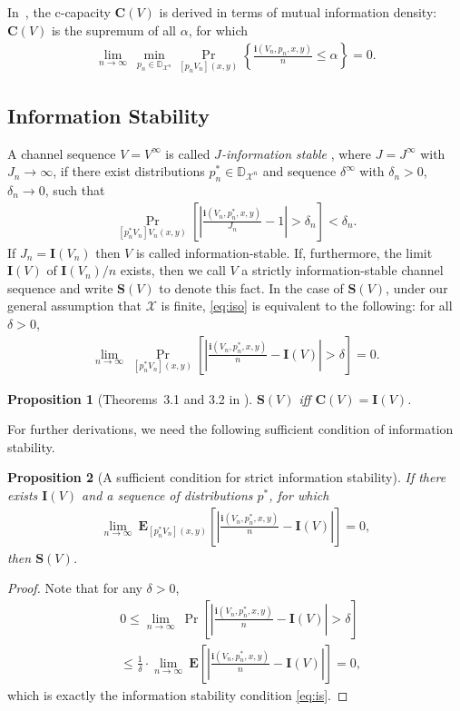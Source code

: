 \documentclass[journal, twocol]{IEEEtran}
\newcommand{\bfC}{{\mathbf{C}}}
\newcommand{\bD}{{\mathbb{D}}}
\newcommand{\bfE}{{\mathbf{E}}}
\newcommand{\bfI}{{\mathbf{I}}}
\newcommand{\bfS}{{\mathbf{S}}}
\newcommand{\mX}{{\mathcal{X}}}
\newcommand{\abs}[1]{\left|{#1}\right|}
\newcommand{\set}[1]{{\left\{{#1}\right\}}}
\newcommand{\brsq}[1]{{\left[{#1}\right]}}
\newcommand{\bi}{\mathbf{i}}
\newtheorem{proposition}{Proposition}
\newcommand{\pW}[2]{[{#1}{#2}]}
\begin{document}
In~\cite{verdu94general}, the c-capacity $\bfC(V)$ is derived in terms of mutual information density: $\bfC(V)$ is the supremum of all $\alpha$, for which
\begin{align}
\lim_{n\to\infty}~\min_{p_n\in\bD_{\mX^n}}\Pr_{\pW{p_n}{V_n}(x,y)}\set{\frac{\bi(V_n,p_n,x,y)}{n}\leq \alpha}=0.
\label{eq:cformula}
\end{align}

\subsection{Information Stability}

A channel sequence $V=V^\infty$ is called \emph{$J$-information stable} \cite{hu62shannon}, where $J=J^\infty$ with $J_n\to\infty$, if there exist distributions $p^*_n\in\bD_{\mX^n}$ and sequence $\delta^\infty$ with $\delta_n>0$, $\delta_n\to 0$, such that
\begin{align}
\Pr_{\pW{p^*_n}{V_n} V_n(x,y)}\brsq{\abs{\frac{\bi(V_n,p^*_n,x,y)}{J_n}-1}>\delta_n} <\delta_n.
\label{eq:iso}
\end{align}
If $J_n=\bfI(V_n)$ then $V$ is called information-stable.
If, furthermore, the limit $\bfI(V)$ of $\bfI(V_n)/n$ exists, then we call $V$ a strictly information-stable channel sequence and write $\bfS(V)$ to denote this fact.
In the case of $\bfS(V)$, under our general assumption that $\mX$ is finite, \eqref{eq:iso} is equivalent to the following: for all $\delta>0$,
\begin{align}
\lim_{n\to\infty}~\Pr_{\pW{p^*_n}{V_n}(x,y)} \brsq{\abs{\frac{\bi(V_n,p^*_n,x,y)}{n}-\bfI(V)}>\delta} = 0.
\label{eq:is}
\end{align}

\begin{proposition}[Theorems~3.1 and 3.2 in \cite{hu62shannon}]
\label{p:is}
$\bfS(V)$ iff $\bfC(V)=\bfI(V)$.
\end{proposition}

For further derivations, we need the following sufficient condition of information stability.
\begin{proposition}[A sufficient condition for strict information stability]
\label{p:ise}
If there exists $\bfI(V)$ and a sequence of distributions $p^*$, for which
\begin{align}
\lim_{n\to\infty}~\bfE_{\pW{p^*_n}{V_n}(x,y)}\brsq{\abs{\frac{\bi(V_n,p^*_n,x,y)}{n}-\bfI(V)}} = 0,
\label{eq:ise}
\end{align}
then $\bfS(V)$.
\end{proposition}
\begin{proof}
Note that for any $\delta>0$,
\begin{align}
&0  \leq\lim_{n\to\infty}~\Pr\brsq{\abs{\frac{\bi(V_n,p^*_n,x,y)}{n}-\bfI(V)}>\delta}
\nonumber\\
&\leq\frac{1}{\delta}\cdot \lim_{n\to\infty}~\bfE\brsq{\abs{\frac{\bi(V_n,p^*_n,x,y)}{n}-\bfI(V)}}=0,
\label{eq:p2proof}
\end{align}
which is exactly the information stability condition \eqref{eq:is}.
\end{proof}
\end{document}
